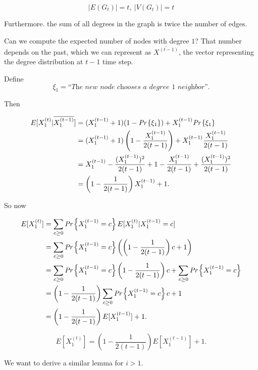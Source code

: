 \begin{equation}
	|E(G_t)| = t,\ |V(G_t)| = t
\end{equation}

Furthermore. the sum of all degrees in the graph is twice the number of edges.

Can we compute the expected number of nodes with degree $1$? That number depends on the past, which we can represent as $\overline{X^{(t-1)}}$, the vector representing the degree distribution at $t-1$ time step.

Define
\begin{equation}
	\xi_1 = \textit{``The new node chooses a degree $1$ neighbor''}.
\end{equation}

Then

\begin{align}
	E[X_1^{(t)} | \overline{X_1^{(t-1)}}] &= (X_1^{(t-1)} + 1)(1-\emph{Pr}\left\{\xi_1\right\}) + X_1^{(t-1)}\emph{Pr}\left\{\xi_1\right\}\\
	&=(X_1^{(t-1)} + 1)\left(1-\frac{X_1^{(t-1)}}{2(t-1)}\right) + X_1^{(t-1)}\frac{X_1^{(t-1)}}{2(t-1)}\\
	&=X_1^{(t-1)} -\frac{(X_1^{(t-1)})^2}{2(t-1)} + 1 - \frac{X_1^{(t-1)}}{2(t-1)} +\frac{(X_1^{(t-1)})^2}{2(t-1)}\\
	&= \left(1 - \frac{1}{2(t-1)}\right)X_1^{(t-1)} + 1.
\end{align}

So now

\begin{align*}
E[X_1^{(t)}] &= \sum_{c \geq 0}\emph{Pr}\left\{X_1^{(t-1)} = c\right\}E[X_1^{(t)}|X_1^{(t-1)}=c]\\
&=\sum_{c \geq 0}\emph{Pr}\left\{X_1^{(t-1)}=c\right\}\left(\left(1-\frac{1}{2(t-1)}\right)c + 1\right)\\
&=\sum_{c \geq 0}\emph{Pr}\left\{X_1^{(t-1)}=c\right\}\left(1-\frac{1}{2(t-1)}\right)c +\sum_{c \geq 0}\emph{Pr}\left\{X_1^{(t-1)}=c\right\}\\
&=\left(1 - \frac{1}{2(t-1)}\right)\sum_{c \geq 0}\emph{Pr}\left\{X_1^{(t-1)} = c\right\}c + 1\\
&=\left(1 - \frac{1}{2(t-1)}\right)E[X_1^{(t-1)}] + 1.
\end{align*}

\begin{lem}\label{pa_lem1}
	\begin{equation}
		E[X_1^{(t)}] = \left(1 - \frac{1}{2(t-1)}\right)E[X_1^{(t-1)}] + 1.
	\end{equation}
\end{lem}

We want to derive a similar lemma for $i > 1$.

